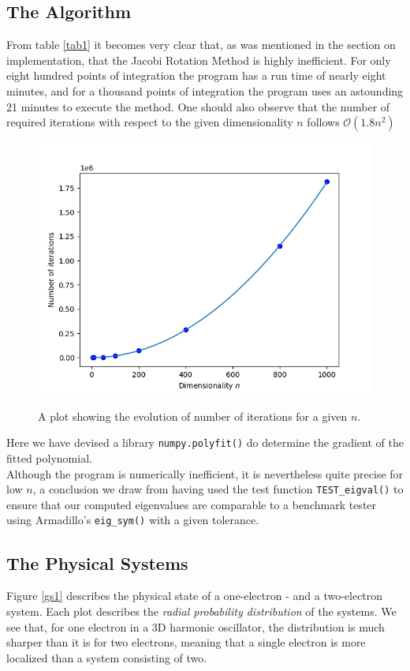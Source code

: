 	\subsection{The Algorithm}
	From table \ref{tab1} it becomes very clear that, as was mentioned in the section on implementation, that the Jacobi Rotation Method is highly inefficient. For only eight hundred points of integration the program has a run time of nearly eight minutes, and for a thousand points of integration the program uses an astounding 21 minutes to execute the method. One should also observe that the number of required iterations with respect to the given dimensionality $n$ follows $\mathcal{O}(1.8n^2)$
	\begin{figure}[H]
		\includegraphics[width=\linewidth]{iterations.png}
		\label{iterations}
		\caption{A plot showing the evolution of number of iterations for a given $n$.}
	\end{figure}
	Here we have devised a library \texttt{numpy.polyfit()} do determine the gradient of the fitted polynomial.\\
	
	Although the program is numerically inefficient, it is nevertheless quite precise for low $n$, a conclusion we draw from having used the test function \texttt{TEST\_eigval()} to ensure that our computed eigenvalues are comparable to a benchmark tester using Armadillo's \texttt{eig\_sym()} with a given tolerance. 
	\subsection{The Physical Systems}
	Figure \ref{gs1} describes the physical state of a one-electron - and a two-electron system. Each plot describes the \emph{radial probability distribution} of the systems. We see that, for one electron in a 3D harmonic oscillator, the distribution is much sharper than it is for two electrons, meaning that a single electron is more localized than a system consisting of two.\\
	
